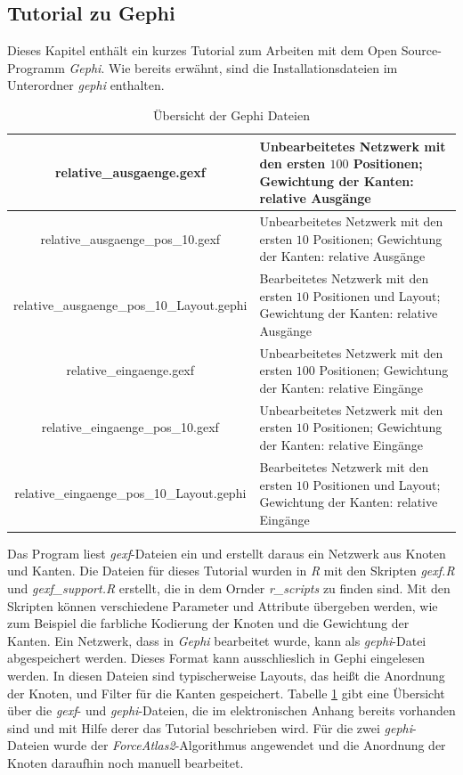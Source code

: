 \subsection{Tutorial zu Gephi}\label{tutorial}

Dieses Kapitel enthält ein kurzes Tutorial zum Arbeiten mit dem Open Source-Programm \textit{Gephi}. Wie bereits erwähnt, sind die Installationsdateien im Unterordner \textit{gephi} enthalten.
\begin{table}[H]
    \begin{center}
        \begin{tabular}{|c|p{7cm}|} 
            \hline  relative\_ausgaenge.gexf  & Unbearbeitetes Netzwerk mit den ersten $100$ Positionen; Gewichtung der Kanten: relative Ausgänge\\
            \hline  relative\_ausgaenge\_pos\_10.gexf  & Unbearbeitetes Netzwerk mit den ersten $10$ Positionen; Gewichtung der Kanten: relative Ausgänge\\
            \hline  relative\_ausgaenge\_pos\_10\_Layout.gephi  & Bearbeitetes Netzwerk mit den ersten $10$ Positionen und Layout; Gewichtung der Kanten: relative Ausgänge\\
            \hline  relative\_eingaenge.gexf  & Unbearbeitetes Netzwerk mit den ersten $100$ Positionen; Gewichtung der Kanten: relative Eingänge\\  
            \hline  relative\_eingaenge\_pos\_10.gexf  & Unbearbeitetes Netzwerk mit den ersten $10$ Positionen; Gewichtung der Kanten: relative Eingänge\\
            \hline relative\_eingaenge\_pos\_10\_Layout.gephi  & Bearbeitetes Netzwerk mit den ersten $10$ Positionen und Layout; Gewichtung der Kanten: relative Eingänge\\     
            \hline
        \end{tabular} 
    \end{center}
    \caption{Übersicht der Gephi Dateien}\label{Gephi_dateien}
\end{table}
\noindent Das Program liest \textit{gexf}-Dateien ein und erstellt daraus ein Netzwerk aus Knoten und Kanten. Die Dateien für dieses Tutorial wurden in \textit{R} mit den Skripten \textit{gexf.R} und \textit{gexf\_support.R} erstellt, die in dem Ornder \textit{r\_scripts} zu finden sind. Mit den Skripten können verschiedene Parameter und Attribute übergeben werden, wie zum Beispiel die farbliche Kodierung der Knoten und die Gewichtung der Kanten. Ein Netzwerk, dass in \textit{Gephi} bearbeitet wurde, kann als \textit{gephi}-Datei abgespeichert werden. Dieses Format kann ausschlieslich in Gephi eingelesen werden. In diesen Dateien sind typischerweise Layouts, das heißt die Anordnung der Knoten, und Filter für die Kanten gespeichert. Tabelle \ref{Gephi_dateien} gibt eine Übersicht über die \textit{gexf}- und \textit{gephi}-Dateien, die im elektronischen Anhang bereits vorhanden sind und mit Hilfe derer das Tutorial beschrieben wird. Für die zwei \textit{gephi}-Dateien wurde der \textit{ForceAtlas2}-Algorithmus angewendet und die Anordnung der Knoten daraufhin noch manuell bearbeitet.\\
